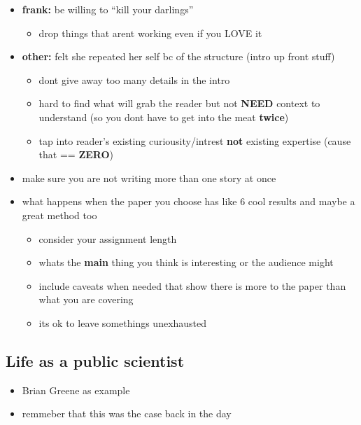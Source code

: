 \documentclass[letterpaper]{scrartcl}
\begin{document}
\begin{itemize}
\itemsep1pt\parskip0pt
\item
  \textbf{frank:} be willing to ``kill your darlings''

  \begin{itemize}
  \itemsep1pt\parskip0pt
  \item
    drop things that arent working even if you LOVE it
  \end{itemize}
\item
  \textbf{other:} felt she repeated her self bc of the structure (intro
  up front stuff)

  \begin{itemize}
  \itemsep1pt\parskip0pt
  \item
    dont give away too many details in the intro
  \item
    hard to find what will grab the reader but not \textbf{NEED} context
    to understand (so you dont have to get into the meat \textbf{twice})
  \item
    tap into reader's existing curiousity/intrest \textbf{not} existing
    expertise (cause that == \textbf{ZERO})
  \end{itemize}
\item
  make sure you are not writing more than one story at once
\item
  what happens when the paper you choose has like 6 cool results and
  maybe a great method too

  \begin{itemize}
  \itemsep1pt\parskip0pt
  \item
    consider your assignment length
  \item
    whats the \textbf{main} thing you think is interesting or the
    audience might
  \item
    include caveats when needed that show there is more to the paper
    than what you are covering
  \item
    its ok to leave somethings unexhausted
  \end{itemize}
\end{itemize}

\subsection{Life as a public
scientist}\label{life-as-a-public-scientist}

\begin{itemize}
\itemsep1pt\parskip0pt
\item
  Brian Greene as example
\item
  remmeber that this was the case back in the day
\end{itemize}
\end{document}
